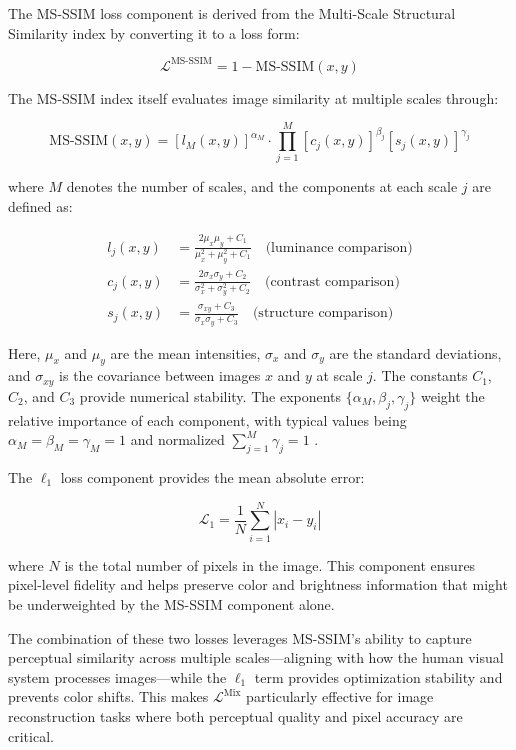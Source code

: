 \documentclass[nomenclature, english, bibtex]{kththesis}
\numberwithin{listing}{chapter}
\begin{document}
The MS-SSIM loss component is derived from the Multi-Scale Structural Similarity index by converting it to a loss form:

\begin{equation}
\mathcal{L}^{\text{MS-SSIM}} = 1 - \text{MS-SSIM}(x, y)
\end{equation}

The MS-SSIM index itself evaluates image similarity at multiple scales through:

\begin{equation}
\text{MS-SSIM}(x, y) = [l_M(x, y)]^{\alpha_M} \cdot \prod_{j=1}^{M} [c_j(x, y)]^{\beta_j} [s_j(x, y)]^{\gamma_j}
\end{equation}

where $M$ denotes the number of scales, and the components at each scale $j$ are defined as:

\begin{align}
l_j(x, y) &= \frac{2\mu_x\mu_y + C_1}{\mu_x^2 + \mu_y^2 + C_1} \quad \text{(luminance comparison)}\\
c_j(x, y) &= \frac{2\sigma_x\sigma_y + C_2}{\sigma_x^2 + \sigma_y^2 + C_2} \quad \text{(contrast comparison)}\\
s_j(x, y) &= \frac{\sigma_{xy} + C_3}{\sigma_x\sigma_y + C_3} \quad \text{(structure comparison)}
\end{align}

Here, $\mu_x$ and $\mu_y$ are the mean intensities, $\sigma_x$ and $\sigma_y$ are the standard deviations, and $\sigma_{xy}$ is the covariance between images $x$ and $y$ at scale $j$. The constants $C_1$, $C_2$, and $C_3$ provide numerical stability. The exponents $\{\alpha_M, \beta_j, \gamma_j\}$ weight the relative importance of each component, with typical values being $\alpha_M = \beta_M = \gamma_M = 1$ and normalized  $\sum_{j=1}^M \gamma_j = 1$ \cite[p.~1399]{wangMultiscaleStructuralSimilarity2003}.

The $\ell_1$ loss component provides the mean absolute error:

\begin{equation}
\mathcal{L}_1 = \frac{1}{N} \sum_{i=1}^{N} |x_i - y_i|
\end{equation}

where $N$ is the total number of pixels in the image. This component ensures pixel-level fidelity and helps preserve color and brightness information that might be underweighted by the MS-SSIM component alone.

The combination of these two losses leverages MS-SSIM's ability to capture perceptual similarity across multiple scales—aligning with how the human visual system processes images—while the $\ell_1$ term provides optimization stability and prevents color shifts. This makes $\mathcal{L}^{\text{Mix}}$ particularly effective for image reconstruction tasks where both perceptual quality and pixel accuracy are critical.
\end{document}
